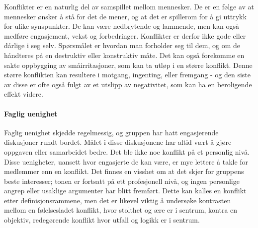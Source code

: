 Konflikter er en naturlig del av samspillet mellom mennesker. De er en følge av at mennesker ønsker å stå for det de mener, og at det er spillerom for å gi uttrykk for ulike synspunkter. De kan være nedbrytende og lammende, men kan også medføre engasjement, vekst og forbedringer. Konflikter er derfor ikke gode eller dårlige i seg selv. Spørsmålet er hvordan man forholder seg til dem, og om de håndteres på en destruktiv eller konstruktiv måte\cite{helsekompetanse}. Det kan også forekomme en sakte oppbygging av småirritasjoner, som kan ta utløp i en større konflikt. Denne større konflikten kan resultere i motgang, ingenting, eller fremgang - og den siste av disse er ofte også fulgt av et utslipp av negativitet, som kan ha en beroligende effekt videre. 

\paragraph{Faglig uenighet}
Faglig uenighet skjedde regelmessig, og gruppen har hatt engasjerende diskusjoner rundt bordet. Målet i disse diskusjonene har altid vært å gjøre oppgaven eller samarbeidet bedre. Det ble ikke noe konflikt på et personlig nivå. Disse uenigheter, uansett hvor engasjerte de kan være, er mye lettere å takle for medlemmer enn en konflikt. Det finnes en visshet om at det skjer for gruppens beste interesser; tonen er fortsatt på ett profesjonell nivå, og ingen personlige angrep eller usaklige argumenter har blitt fremført. Dette kan kalles en konflikt etter definisjonsrammene, men det er likevel viktig å undersøke kontrasten mellom en følelsesladet konflikt, hvor stolthet og ære er i sentrum, kontra en objektiv, redegørende konflikt hvor utfall og logikk er i sentrum. 






